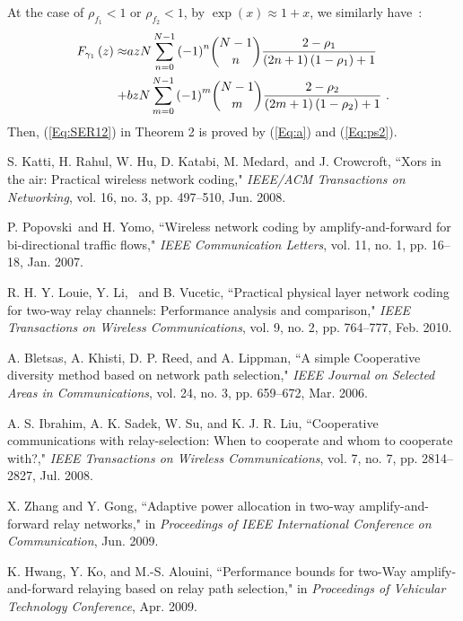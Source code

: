 \documentclass[onecolumn,letterpaper,11pt,draftclsnofoot]{IEEEtran}
\begin{document}
At the case of $\rho_{f_1}<1$ or $\rho_{f_2}<1$, by
$\exp\left(x\right) \approx 1+x$, we similarly have~:
\begin{align}
F_{\gamma _1}  \left( z \right) \approx  &azN\sum\limits_{n = 0}^{N
- 1} {\left( { - 1} \right)^n } \binom{N-1}{n}\frac{{2 - \rho _1
}}{{\left( {2n + 1} \right)\left( {1 - \rho _1 } \right) + 1}}
\\\notag
+ &bzN\sum\limits_{m = 0}^{N - 1} {\left( { - 1} \right)^m }
\binom{N-1}{m}\frac{{2 - \rho _2 }}{{\left( {2m + 1} \right)\left(
{1 - \rho _2 } \right) + 1}}~.
\end{align}
Then, (\ref{Eq:SER12}) in Theorem 2 is proved by (\ref{Eq:a}) and
(\ref{Eq:ps2}).

\begin{thebibliography}{1}

S. Katti, H. Rahul, W. Hu, D. Katabi, M. Medard,~and
J. Crowcroft, ``Xors in the air: Practical wireless network coding,"
\emph{IEEE/ACM Transactions on Networking}, vol. 16, no. 3, pp.
497--510, Jun. 2008.

P. Popovski~and H. Yomo, ``Wireless network coding by
amplify-and-forward for bi-directional traffic flows," \emph{IEEE
Communication Letters}, vol. 11, no. 1, pp. 16--18, Jan. 2007.

 R. H. Y. Louie, Y. Li,~ and B. Vucetic, ``Practical physical layer network
coding for two-way relay channels: Performance analysis and
comparison," \emph{IEEE Transactions on Wireless Communications},
vol. 9, no. 2, pp. 764--777, Feb. 2010.

A. Bletsas, A. Khisti, D. P. Reed, and A. Lippman, ``A simple
Cooperative diversity method based on network path selection,"
\emph{IEEE Journal on Selected Areas in Communications}, vol. 24,
no. 3, pp. 659--672, Mar. 2006.

A. S. Ibrahim, A. K. Sadek, W. Su, and K. J. R. Liu, ``Cooperative communications with relay-selection: When to cooperate
and whom to cooperate with?," \emph{IEEE Transactions on Wireless
Communications}, vol. 7, no. 7, pp. 2814--2827, Jul. 2008.

 X. Zhang and Y. Gong, ``Adaptive power allocation in two-way amplify-and-forward relay
networks," in \emph{Proceedings of IEEE International Conference on
Communication}, Jun. 2009.

K. Hwang, Y. Ko, and M.-S. Alouini, ``Performance
bounds for two-Way amplify-and-forward relaying based on relay path
selection," in \emph{Proceedings of Vehicular Technology
Conference}, Apr. 2009.


\end{thebibliography}
\end{document}

